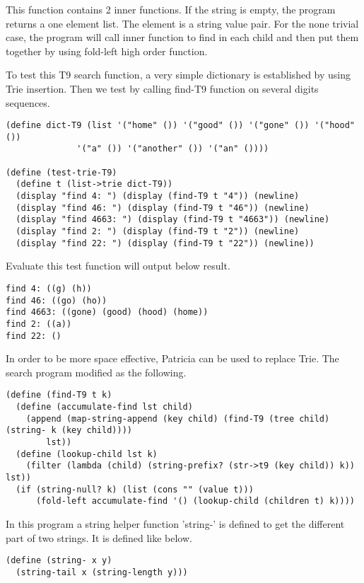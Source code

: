 \documentclass{article}
\begin{document}
This function contains 2 inner functions. If the string is empty, the
program returns a one element list. The element is a string value pair.
For the none trivial case, the program will call inner function to
find in each child and then put them together by using fold-left high
order function.

To test this T9 search function, a very simple dictionary is
established by using Trie insertion. Then we test by calling find-T9
function on several digits sequences.

\begin{lstlisting}
(define dict-T9 (list '("home" ()) '("good" ()) '("gone" ()) '("hood" ()) 
		      '("a" ()) '("another" ()) '("an" ())))

(define (test-trie-T9)
  (define t (list->trie dict-T9))
  (display "find 4: ") (display (find-T9 t "4")) (newline)
  (display "find 46: ") (display (find-T9 t "46")) (newline)
  (display "find 4663: ") (display (find-T9 t "4663")) (newline)
  (display "find 2: ") (display (find-T9 t "2")) (newline)
  (display "find 22: ") (display (find-T9 t "22")) (newline))
\end{lstlisting}

Evaluate this test function will output below result.

\begin{verbatim}
find 4: ((g) (h))
find 46: ((go) (ho))
find 4663: ((gone) (good) (hood) (home))
find 2: ((a))
find 22: ()
\end{verbatim}

In order to be more space effective, Patricia can be used to replace
Trie. The search program modified as the following.

\begin{lstlisting}
(define (find-T9 t k)
  (define (accumulate-find lst child)
    (append (map-string-append (key child) (find-T9 (tree child) (string- k (key child))))
	    lst))
  (define (lookup-child lst k)
    (filter (lambda (child) (string-prefix? (str->t9 (key child)) k)) lst))
  (if (string-null? k) (list (cons "" (value t)))
      (fold-left accumulate-find '() (lookup-child (children t) k))))
\end{lstlisting}

In this program a string helper function 'string-' is defined to get
the different part of two strings. It is defined like below.

\begin{lstlisting}
(define (string- x y)
  (string-tail x (string-length y)))
\end{lstlisting}
\end{document}
